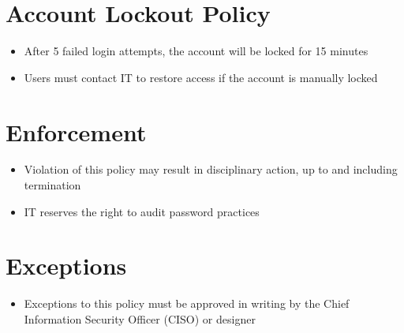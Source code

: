 \section{Account Lockout Policy}
\begin{itemize}
    \item After 5 failed login attempts, the account will be locked for 15 minutes
    \item Users must contact IT to restore access if the account is manually locked
\end{itemize}

\section{Enforcement}
\begin{itemize}
    \item Violation of this policy may result in disciplinary action, up to and including termination
    \item IT reserves the right to audit password practices
\end{itemize}

\section{Exceptions}
\begin{itemize}
    \item Exceptions to this policy must be approved in writing by the Chief Information Security Officer (CISO) or designer
\end{itemize}
